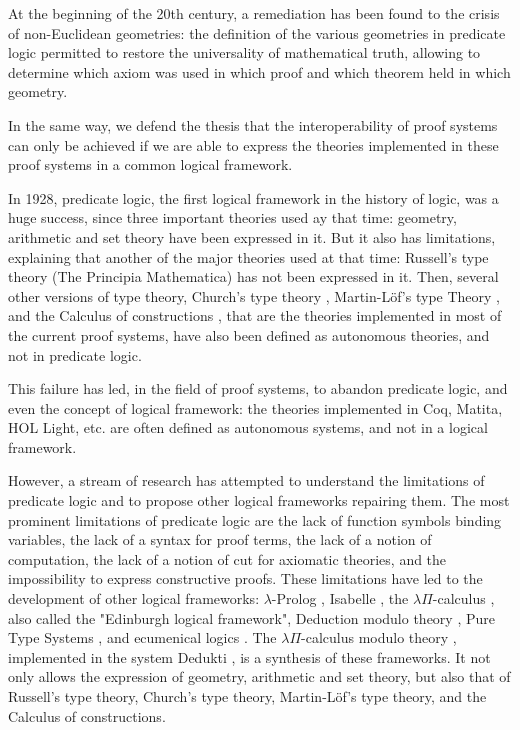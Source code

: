 At the beginning of the 20th century, a remediation has been found to
the crisis of non-Euclidean geometries: the definition of the various
geometries in predicate logic \cite{HilbertAckermann} permitted to
restore the universality of mathematical truth, allowing to determine
which axiom was used in which proof and which theorem held in
which geometry.

In the same way, we defend the thesis that the interoperability of
proof systems can only be achieved if we are able to express the theories
implemented in these proof systems in a common logical framework.

In 1928, predicate logic, the first logical framework in the history
of logic, was a huge success, since three important theories used ay
that time: geometry, arithmetic and set theory have been expressed in
it. But it also has limitations, explaining that another of the major
theories used at that time: Russell's type theory (The Principia
Mathematica) has not been expressed in it.  Then, several other
versions of type theory, Church's type theory \cite{Church40},
Martin-L\"of's type Theory \cite{Martin-Lof84}, and the Calculus of
constructions \cite{CoquandHuet88}, that are the theories implemented
in most of the current proof systems, have also been defined as
autonomous theories, and not in predicate logic.

This failure has led, in the field of proof systems, to abandon
predicate logic, and even the concept of logical framework: the
theories implemented in {\sc Coq}, {\sc Matita}, {\sc HOL Light},
etc. are often defined as autonomous systems, and not in a logical
framework.

However, a stream of research has attempted to understand the
limitations of predicate logic and to propose other logical frameworks
repairing them. The most prominent limitations of predicate logic are
the lack of function symbols binding variables, the lack of a syntax
for proof terms, the lack of a notion of computation, the lack of a
notion of cut for axiomatic theories, and the impossibility to express
constructive proofs. These limitations have led to the development of
other logical frameworks: $\lambda$-Prolog \cite{NadathurMiller88,
  MillerNadathur12}, Isabelle \cite{Paulson90}, the $\lambda
\Pi$-calculus \cite{HarperHonsellPlotkin91}, also called the
"Edinburgh logical framework", Deduction modulo theory
\cite{DowekHardinKirchner03, DowekWerner03}, Pure Type Systems
\cite{Berardi88,Terlouw89}, and ecumenical logics
\cite{Prawitz15,Dowek15,PereiraRodriguez17}. The $\lambda
\Pi$-calculus modulo theory \cite{CousineauDowek07}, implemented in
the system {\sc Dedukti} \cite{Assaf16}, is a synthesis of these
frameworks. It not only allows the expression of geometry, arithmetic
and set theory, but also that of Russell's type theory, Church's type
theory, Martin-L\"of's type theory, and the Calculus of constructions.


